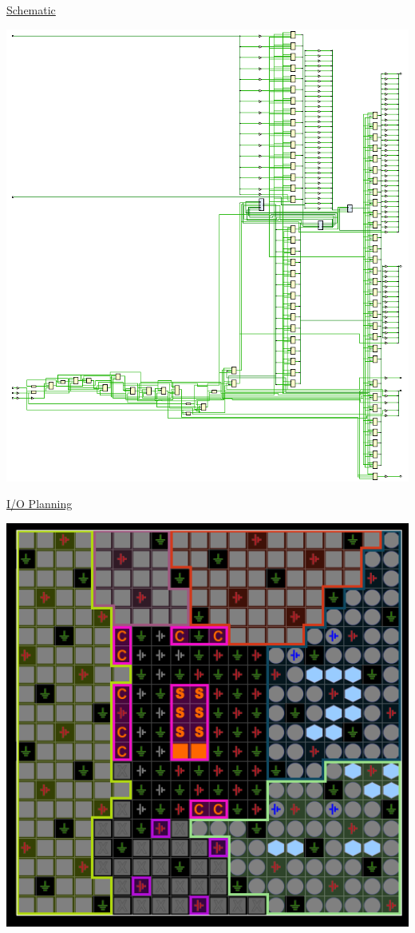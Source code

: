 \documentclass[11pt]{article}
\begin{document}
\begin{center}
    \newpage

    \underline{Schematic}

    \includegraphics[width = 1\textwidth]{schematic.png}

    \newpage

    \underline{I/O Planning}

    \includegraphics[width = 1\textwidth]{ioplan.png}


\end{center}
\end{document}
